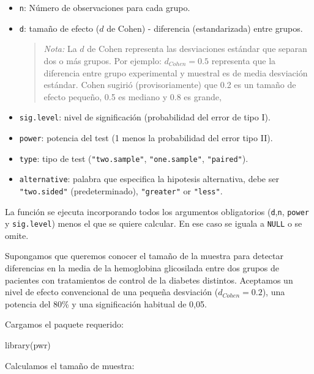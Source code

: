 \documentclass[
  spanish,
  a4paper,
]{scrbook}
\newenvironment{Shaded}{\begin{snugshade}}{\end{snugshade}}
\newcommand{\FunctionTok}[1]{\textcolor[rgb]{0.28,0.35,0.67}{#1}}
\newcommand{\NormalTok}[1]{\textcolor[rgb]{0.00,0.23,0.31}{#1}}
\begin{document}
\begin{itemize}
\item
  \texttt{n}: Número de observaciones para cada grupo.
\item
  \texttt{d}: tamaño de efecto (\(d\) de Cohen) - diferencia
  (estandarizada) entre grupos.

  \begin{quote}
  \emph{Nota:} La \(d\) de Cohen representa las desviaciones estándar
  que separan dos o más grupos. Por ejemplo: \(d_{Cohen} = 0.5\)
  representa que la diferencia entre grupo experimental y muestral es de
  media desviación estándar. Cohen sugirió (provisoriamente) que 0.2 es
  un tamaño de efecto pequeño, 0.5 es mediano y 0.8 es grande,
  \end{quote}
\item
  \texttt{sig.level}: nivel de significación (probabilidad del error de
  tipo I).
\item
  \texttt{power}: potencia del test (1 menos la probabilidad del error
  tipo II).
\item
  \texttt{type}: tipo de test (\texttt{"two.sample"},
  \texttt{"one.sample"}, \texttt{"paired"}).
\item
  \texttt{alternative}: palabra que especifica la hipotesis alternativa,
  debe ser \texttt{"two.sided"} (predeterminado), \texttt{"greater"} or
  \texttt{"less"}.
\end{itemize}

La función se ejecuta incorporando todos los argumentos obligatorios
(\texttt{d},\texttt{n}, \texttt{power} y \texttt{sig.level}) menos el
que se quiere calcular. En ese caso se iguala a \texttt{NULL} o se
omite.

Supongamos que queremos conocer el tamaño de la muestra para detectar
diferencias en la media de la hemoglobina glicosilada entre dos grupos
de pacientes con tratamientos de control de la diabetes distintos.
Aceptamos un nivel de efecto convencional de una pequeña desviación
(\(d_{Cohen} = 0.2\)), una potencia del 80\% y una significación
habitual de 0,05.

Cargamos el paquete requerido:

\begin{Shaded}
\begin{Highlighting}[]
\FunctionTok{library}\NormalTok{(pwr)}
\end{Highlighting}
\end{Shaded}

Calculamos el tamaño de muestra:
\end{document}
